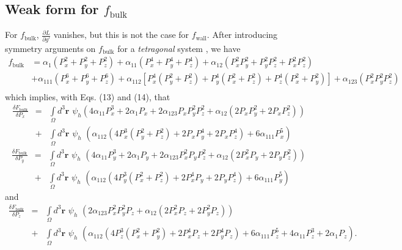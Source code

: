 \documentclass[16pt]{article} %
\begin{document}
%
\subsection{Weak form for $f_\mathrm{bulk}$}
%
For $f_\mathrm{bulk}$, $\frac{\partial L}{\partial g'}$ vanishes, but this is not the case for $f_\mathrm{wall}$.
%
After introducing symmetry arguments on $f_\mathrm{bulk}$ for a \emph{tetragonal} system \cite{Li2001, Cao2008}, we have
%
\begin{align}\tag{14}
f_\mathrm{bulk} &= \alpha_1 \left(P_x^2 + P_y^2 + P_z^2 \right) + \alpha_{11} \left(P_x^4 + P_y^4 + P_z^4 \right) + \alpha_{12} \left(P_x^2 P_y^2 + P_y^2 P_z^2 + P_x^2 P_z^2 \right) \\ \nonumber
&+ \alpha_{111} \left(P_x^6 + P_y^6 + P_z^6 \right) + \alpha_{112} \left[P_x^4 \left(P_y^2 + P_z^2 \right) + P_y^4 \left(P_x^2 + P_z^2 \right) + P_z^4 \left(P_x^2 + P_y^2 \right) \right] + \alpha_{123} \left(P_x^2 P_y^2 P_z^2 \right) \\ \nonumber
\end{align}
%
which implies, with Eqs. (13) and (14), that
%
\begin{eqnarray}\nonumber
\frac{ \delta F_\mathrm{bulk}}{\delta P_x} &=& \int\limits_\Omega d^3  \textbf{r} \,\,\psi_h \left(4 \alpha _{11} P_x^3+2 \alpha _1 P_x+2 \alpha _{123} P_x P_y^2 P_z^2+\alpha _{12} \left(2 P_x P_y^2+2 P_x P_z^2\right) \right)\\ \nonumber
&+&  \int\limits_\Omega d^3  \textbf{r} \,\,\psi_h \,\, \left(\alpha _{112} \left(4 P_x^3 \left(P_y^2+P_z^2\right)+2 P_x P_y^4+2 P_x P_z^4\right) + 6 \alpha _{111} P_x^5\right)
\end{eqnarray}
%
\begin{eqnarray}\nonumber
\frac{ \delta F_\mathrm{bulk}}{\delta P_y} &=& \int\limits_\Omega d^3  \textbf{r} \,\,\psi_h \,\, \left(4 \alpha _{11} P_y^3+2 \alpha _1 P_y +2 \alpha _{123} P_x^2 P_y P_z^2+\alpha _{12} \left(2 P_x^2 P_y+2 P_y P_z^2\right) \right) \\ \nonumber
&+&  \int\limits_\Omega d^3  \textbf{r} \,\,\psi_h \,\, \left(\alpha _{112} \left(4 P_y^3 \left(P_x^2+P_z^2\right)+2 P_x^4 P_y+2 P_y P_z^4\right)+6 \alpha _{111} P_y^5 \right)
\end{eqnarray}
%
and
%
\begin{eqnarray}\nonumber
\frac{ \delta F_\mathrm{bulk}}{\delta P_z} &=& \int\limits_\Omega d^3  \textbf{r} \,\,\psi_h \,\, \left(2 \alpha _{123} P_x^2 P_y^2 P_z+\alpha _{12} \left(2 P_x^2 P_z+2 P_y^2 P_z\right) \right) \\ \nonumber
&+& \int\limits_\Omega d^3  \textbf{r} \,\,\psi_h \,\,  \left(\alpha _{112} \left(4 P_z^3 \left(P_x^2+P_y^2\right)+2 P_x^4 P_z+2 P_y^4 P_z\right)+6 \alpha _{111} P_z^5+4 \alpha _{11} P_z^3+2 \alpha _1 P_z \right).
\end{eqnarray}
\end{document}
